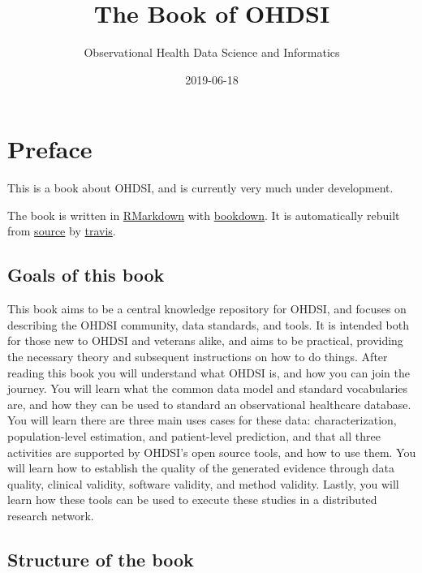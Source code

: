 \documentclass[]{book}
\title{The Book of OHDSI}
\author{Observational Health Data Science and Informatics}
\date{2019-06-18}
\begin{document}
\maketitle

{
\setcounter{tocdepth}{1}
\tableofcontents
}
\chapter*{Preface}\label{preface}

 This is a book about OHDSI, and is currently very much under
development.

The book is written in \href{https://rmarkdown.rstudio.com}{RMarkdown}
with \href{https://bookdown.org}{bookdown}. It is automatically rebuilt
from \href{https://github.com/OHDSI/TheBookOfOhdsi}{source} by
\href{http://travis-ci.org/}{travis}.

\section*{Goals of this book}\label{goals-of-this-book}

This book aims to be a central knowledge repository for OHDSI, and
focuses on describing the OHDSI community, data standards, and tools. It
is intended both for those new to OHDSI and veterans alike, and aims to
be practical, providing the necessary theory and subsequent instructions
on how to do things. After reading this book you will understand what
OHDSI is, and how you can join the journey. You will learn what the
common data model and standard vocabularies are, and how they can be
used to standard an observational healthcare database. You will learn
there are three main uses cases for these data: characterization,
population-level estimation, and patient-level prediction, and that all
three activities are supported by OHDSI's open source tools, and how to
use them. You will learn how to establish the quality of the generated
evidence through data quality, clinical validity, software validity, and
method validity. Lastly, you will learn how these tools can be used to
execute these studies in a distributed research network.

\section*{Structure of the book}\label{structure-of-the-book}
\end{document}
